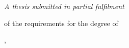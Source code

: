 %
%
%
\begin{titlepage}
    \centering
    {\large\university\par}
    \vspace{0.5em}
    {\large\department\par}
    \vfill
    {\LARGE\textsc{\thetitle}\par}
    \vspace{4em}
    {\Large\textsc{\theauthor}\par}
    \vfill
    {\large\itshape
        A thesis submitted in partial fulfilment\par
        of the requirements for the degree of\par
        \degree}
    \vfill
    \makeatletter
    {\large\DTMenglishmonthname{\@dtm@ini@month}, \@dtm@ini@year}
    \makeatother
\end{titlepage}
